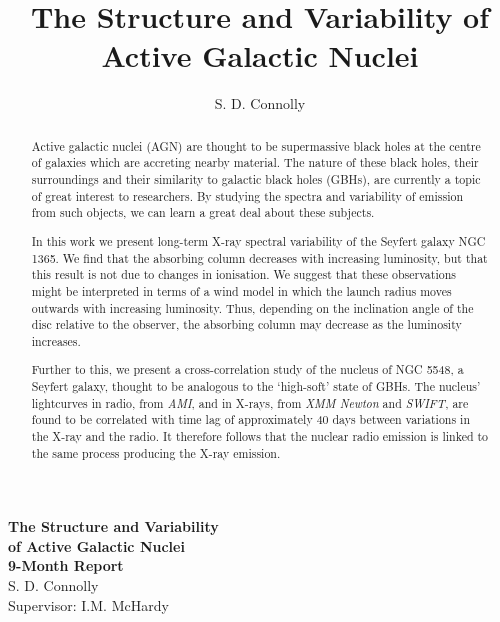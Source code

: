 \documentclass[letters,useAMS,usenatbib]{samnote}
\title[The Structure and Variability of Active Galactic Nuclei]{The Structure and Variability of Active Galactic Nuclei}
\author[S. D. Connolly]{S. D. Connolly}
\begin{document}

\pagerange{\pageref{firstpage}--\pageref{lastpage}} 

\vspace{\fill}
 \begin{titlepage}
    \vspace*{\fill}
    \begin{center}
      {\Huge \bf The Structure and Variability \\[0.2cm] of Active Galactic Nuclei}\\[1cm]
      {\huge \bf 9-Month Report}\\[2cm]
      
      {\huge S. D. Connolly}\\[1cm]
      {\Large Supervisor: I.M. McHardy}\\[0.4cm]

    \end{center}
    \vspace*{\fill}




\label{firstpage}

\begin{abstract}
\vspace{0.5cm}
\begin{center} 

Active galactic nuclei (AGN) are thought to be supermassive black holes at the centre of galaxies
which are accreting nearby material. The nature of these black holes, their surroundings 
and their similarity to galactic black holes (GBHs), are currently
a topic of great interest to researchers. By studying the spectra and variability of emission
from such objects, we can learn a great deal about these subjects.

In this work we present long-term X-ray spectral variability of the Seyfert
galaxy NGC 1365. We find that the absorbing column
decreases with increasing luminosity, but that this result is not due
to changes in ionisation. We suggest that these observations might be
interpreted in terms of a wind model in which the launch radius moves outwards with
increasing luminosity. Thus, depending
on the inclination angle of the disc relative to the observer, the absorbing column may decrease
as the luminosity increases. 

Further to this, we present a cross-correlation study of the nucleus of NGC 5548, a Seyfert galaxy,
thought to be analogous to the `high-soft' state of GBHs. The nucleus' lightcurves in radio, from {\it AMI},
and in X-rays, from {\it XMM Newton} and {\it SWIFT}, are found to be correlated with time lag of approximately
40 days between variations in the X-ray and the radio. It therefore follows that the nuclear radio emission
is linked to the same process producing the X-ray emission.

\end{center} 
\end{abstract}
\vspace{\fill}

\end{titlepage}
\end{document}
